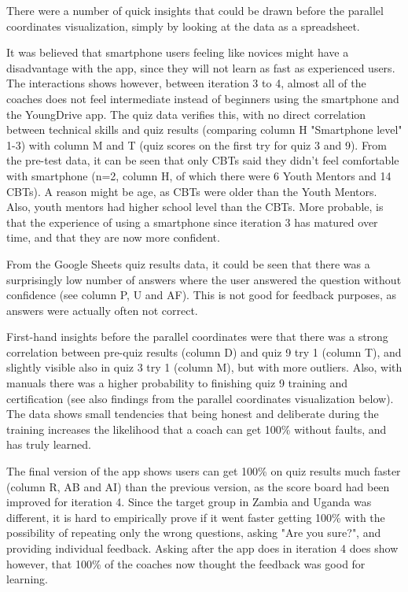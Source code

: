 There were a number of quick insights that could be drawn before the parallel coordinates visualization, simply by looking at the data as a spreadsheet.

It was believed that smartphone users feeling like novices might have a disadvantage with the app, since they will not learn as fast as experienced users. The interactions shows however, between iteration 3 to 4, almost all of the coaches does not feel intermediate instead of beginners using the smartphone and the YoungDrive app. The quiz data verifies this, with no direct correlation between technical skills and quiz results (comparing column H "Smartphone level" 1-3) with column M and T (quiz scores on the first try for quiz 3 and 9). From the pre-test data, it can be seen that only CBTs said they didn't feel comfortable with smartphone (n=2, column H, of which there were 6 Youth Mentors and 14 CBTs). A reason might be age, as CBTs were older than the Youth Mentors. Also, youth mentors had higher school level than the CBTs. More probable, is that the experience of using a smartphone since iteration 3 has matured over time, and that they are now more confident. %

From the Google Sheets quiz results data, it could be seen that there was a surprisingly low number of answers where the user answered the question without confidence (see column P, U and AF). This is not good for feedback purposes, as answers were actually often not correct.

First-hand insights before the parallel coordinates were that there was a strong correlation between pre-quiz results (column D) and quiz 9 try 1 (column T), and slightly visible also in quiz 3 try 1 (column M), but with more outliers. Also, with manuals there was a higher probability to finishing quiz 9 training and certification (see also findings from the parallel coordinates visualization below). The data shows small tendencies that being honest and deliberate during the training increases the likelihood that a coach can get 100\% without faults, and has truly learned.

The final version of the app shows users can get 100\% on quiz results much faster (column R, AB and AI) than the previous version, as the score board had been improved for iteration 4. Since the target group in Zambia and Uganda was different, it is hard to empirically prove if it went faster getting 100\% with the possibility of repeating only the wrong questions, asking "Are you sure?", and providing individual feedback. Asking after the app does in iteration 4 does show however, that 100\% of the coaches now thought the feedback was good for learning.

